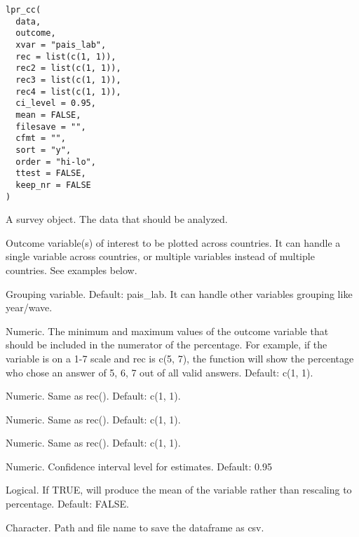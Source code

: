 \documentclass[a4paper]{book}
\begin{document}
%
\begin{Usage}
\begin{verbatim}
lpr_cc(
  data,
  outcome,
  xvar = "pais_lab",
  rec = list(c(1, 1)),
  rec2 = list(c(1, 1)),
  rec3 = list(c(1, 1)),
  rec4 = list(c(1, 1)),
  ci_level = 0.95,
  mean = FALSE,
  filesave = "",
  cfmt = "",
  sort = "y",
  order = "hi-lo",
  ttest = FALSE,
  keep_nr = FALSE
)
\end{verbatim}
\end{Usage}
%
\begin{Arguments}
\begin{ldescription}
\item[\code{data}] A survey object.  The data that should be analyzed.

\item[\code{outcome}] Outcome variable(s) of interest to be plotted across countries.
It can handle a single variable across countries, or multiple variables instead of multiple countries. See examples below.

\item[\code{xvar}] Grouping variable. Default: pais\_lab. It can handle other variables grouping like year/wave.

\item[\code{rec}] Numeric. The minimum and maximum values of the outcome variable that
should be included in the numerator of the percentage.  For example, if the variable
is on a 1-7 scale and rec is c(5, 7), the function will show the percentage who chose
an answer of 5, 6, 7 out of all valid answers.  Default: c(1, 1).

\item[\code{rec2}] Numeric. Same as rec(). Default: c(1, 1).

\item[\code{rec3}] Numeric. Same as rec(). Default: c(1, 1).

\item[\code{rec4}] Numeric. Same as rec(). Default: c(1, 1).

\item[\code{ci\_level}] Numeric. Confidence interval level for estimates.  Default: 0.95

\item[\code{mean}] Logical.  If TRUE, will produce the mean of the variable rather than
rescaling to percentage.  Default: FALSE.

\item[\code{filesave}] Character.  Path and file name to save the dataframe as csv.


\end{ldescription}
\end{Arguments}
\end{document}
